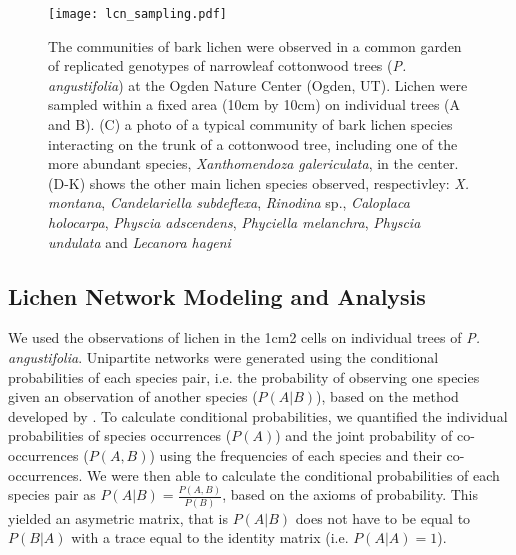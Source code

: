 \documentclass[9pt,twocolumn,twoside,lineno]{pnas-new}
\begin{document}
{\begin{figure}[ht]
\centering
\texttt{[image: lcn\_sampling.pdf]}
\caption{The communities of bark lichen were observed in a common
  garden of replicated genotypes of narrowleaf cottonwood trees
  (\textit{P. angustifolia}) at the Ogden Nature Center (Ogden,
  UT). Lichen were sampled within a fixed area (10cm by 10cm) on
  individual trees (A and B). (C) a photo of a typical community of
  bark lichen species interacting on the trunk of a cottonwood tree,
  including one of the more abundant species, \textit{Xanthomendoza
    galericulata}, in the center. (D-K) shows the other main lichen
  species observed, respectivley: \textit{X. montana},
  \textit{Candelariella subdeflexa}, \textit{Rinodina} sp.,
  \textit{Caloplaca holocarpa}, \textit{Physcia adscendens},
  \textit{Phyciella melanchra}, \textit{Physcia undulata} and
  \textit{Lecanora hageni}}
\label{fig:lichen_sampling}
\end{figure}



\subsection*{Lichen Network Modeling and Analysis}

We used the observations of lichen in the 1cm2 cells on individual
trees of \textit{P. angustifolia}. Unipartite networks were generated
using the conditional probabilities of each species pair, i.e. the
probability of observing one species given an observation of another
species ($P(A | B)$), based on the method developed by
\citep{Araujo2011}. To calculate conditional probabilities, we
quantified the individual probabilities of species occurrences
($P(A)$) and the joint probability of co-occurrences ($P(A,B)$) using
the frequencies of each species and their co-occurrences. We were then
able to calculate the conditional probabilities of each species pair
as $P(A|B) = \frac{P(A,B)}{P(B)}$, based on the axioms of
probability. This yielded an asymetric matrix, that is $P(A|B)$ does
not have to be equal to $P(B|A)$ with a trace equal to the identity
matrix (i.e. $P(A|A) = 1$). 

}
\end{document}
